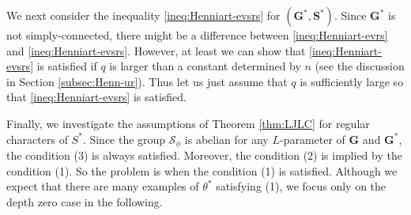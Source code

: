 \documentclass{amsart}
\newcommand{\bfG}{\mathbf{G}}
\newcommand{\bfS}{\mathbf{S}}
\theoremstyle{plain}
\theoremstyle{definition}
\theoremstyle{remark}
\theoremstyle{theorem}
\begin{document}
We next consider the inequality \eqref{ineq:Henniart-evsrs} for $(\bfG^{\ast},\bfS^{\ast})$.
Since $\bfG^{\ast}$ is not simply-connected, there might be a difference between \eqref{ineq:Henniart-evrs} and \eqref{ineq:Henniart-evsrs}.
However, at least we can show that \eqref{ineq:Henniart-evsrs} is satisfied if $q$ is larger than a constant determined by $n$ (see the discussion in Section \ref{subsec:Henn-ur}).
Thus let us just assume that $q$ is sufficiently large so that \eqref{ineq:Henniart-evsrs} is satisfied.

Finally, we investigate the assumptions of Theorem \ref{thm:LJLC} for regular characters of $S^{\ast}$.
Since the group $\mathcal{S}_{\phi}$ is abelian for any $L$-parameter of $\bfG$ and $\bfG^{\ast}$, the condition (3) is always satisfied.
Moreover, the condition (2) is implied by the condition (1).
So the problem is when the condition (1) is satisfied.
Although we expect that there are many examples of $\theta^{\ast}$ satisfying (1), we focus only on the depth zero case in the following.
\end{document}

